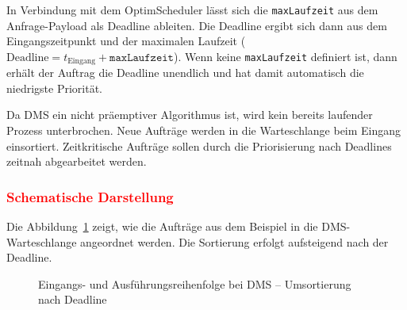 \documentclass[
    12pt,               
    a4paper,            
    ngerman,            
    parskip=half,       
    headings=normal,   
    numbers=enddot,     
    toc=chapterentrywithdots 
]{scrreprt}\usepackage[utf8]{inputenc}
\begin{document}
In Verbindung mit dem OptimScheduler lässt sich die \texttt{maxLaufzeit} aus dem Anfrage-Payload als Deadline ableiten. Die Deadline ergibt sich dann aus dem Eingangszeitpunkt und der maximalen Laufzeit ($\text{Deadline} = t_\text{Eingang} + \texttt{maxLaufzeit}$). Wenn keine \texttt{maxLaufzeit} definiert ist, dann erhält der Auftrag die Deadline unendlich und hat damit automatisch die niedrigste Priorität.

Da DMS ein nicht präemptiver Algorithmus ist, wird kein bereits laufender Prozess unterbrochen. Neue Aufträge werden in die Warteschlange beim Eingang einsortiert. Zeitkritische Aufträge sollen durch die Priorisierung nach Deadlines zeitnah abgearbeitet werden. 

\subsubsection{\textcolor{red}{Schematische Darstellung}}
Die Abbildung~\ref{fig:dms_queue} zeigt, wie die Aufträge aus dem Beispiel in die DMS-Warteschlange angeordnet werden. Die Sortierung erfolgt aufsteigend nach der Deadline.

\begin{figure}[H]
\centering
{}
\caption{Eingangs- und Ausführungsreihenfolge bei DMS -- Umsortierung nach Deadline}
\label{fig:dms_queue}
\end{figure}
\end{document}
